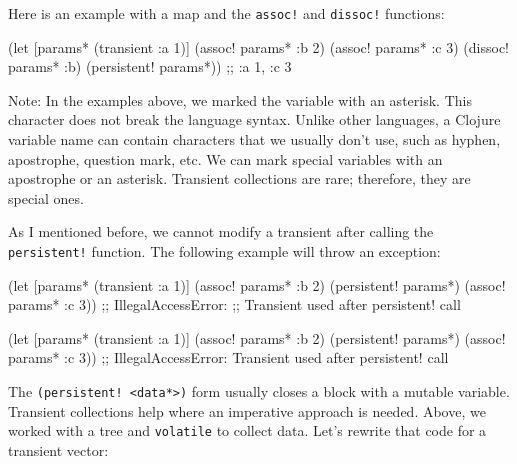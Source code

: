 
\noindent
Here is an example with a map and the \verb|assoc!| and \verb|dissoc!| functions:

\begin{english}
  \begin{clojure}
(let [params* (transient {:a 1})]
  (assoc! params* :b 2)
  (assoc! params* :c 3)
  (dissoc! params* :b)
  (persistent! params*))
;; {:a 1, :c 3}
  \end{clojure}
\end{english}

Note: In the examples above, we marked the variable with an asterisk.
This character does not break the language syntax.
Unlike other languages, a Clojure variable name can contain characters that we usually don't use, such as hyphen, apostrophe, question mark, etc.
We can mark special variables with an apostrophe or an asterisk.
Transient collections are rare; therefore, they are special ones.

As I mentioned before, we cannot modify a transient after calling the \verb|persistent!| function.
The following example will throw an exception:

\ifx\DEVICETYPE\MOBILE

\begin{english}
  \begin{clojure}
(let [params* (transient {:a 1})]
  (assoc! params* :b 2)
  (persistent! params*)
  (assoc! params* :c 3))
;; IllegalAccessError:
;; Transient used after persistent! call
  \end{clojure}
\end{english}

\else

\begin{english}
  \begin{clojure}
(let [params* (transient {:a 1})]
  (assoc! params* :b 2)
  (persistent! params*)
  (assoc! params* :c 3))
;; IllegalAccessError: Transient used after persistent! call
  \end{clojure}
\end{english}

\fi

The \verb|(persistent! <data*>)| form usually closes a block with a mutable variable.
Transient collections help where an imperative approach is needed. Above, we worked with a tree and \verb|volatile| to collect data.
Let's rewrite that code for a transient vector:

